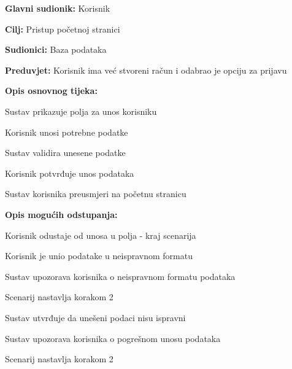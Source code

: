 					\noindent {}
					\begin{packed_item}
	
						\item \textbf{Glavni sudionik: }Korisnik
						\item  \textbf{Cilj:} Pristup početnoj stranici
						\item  \textbf{Sudionici:} Baza podataka
						\item  \textbf{Preduvjet:} Korisnik ima već stvoreni račun i odabrao je opciju za prijavu
						\item  \textbf{Opis osnovnog tijeka:}
						
						\item[] \begin{packed_enum}
							\item Sustav prikazuje polja za unos korisniku
							\item Korisnik unosi potrebne podatke
							\item Sustav validira unesene podatke
							\item Korisnik potvrđuje unos podataka
							\item Sustav korisnika preusmjeri na početnu stranicu
						\end{packed_enum}
						\eject
						\item  \textbf{Opis mogućih odstupanja:}

						\item[] \begin{packed_item}
							\item[2.a] Korisnik odustaje od unosa u polja - kraj scenarija
							\item[3.a] Korisnik je unio podatake u neispravnom formatu
							\item[] \begin{packed_enum}
								\item Sustav upozorava korisnika o neispravnom formatu podataka
								\item Scenarij nastavlja korakom 2 
							\end{packed_enum}	
							\item[5.a] Sustav utvrđuje da unešeni podaci nisu ispravni
							\item[] \begin{packed_enum}
								\item Sustav upozorava korisnika o pogrešnom unosu podataka
								\item Scenarij nastavlja korakom 2 
							\end{packed_enum}					
						\end{packed_item}
					\end{packed_item}

